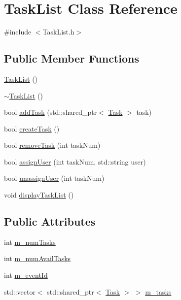 \hypertarget{class_task_list}{}\section{Task\+List Class Reference}
\label{class_task_list}


{\ttfamily \#include $<$Task\+List.\+h$>$}

\subsection*{Public Member Functions}
\begin{DoxyCompactItemize}
\item 
\mbox{\hyperlink{class_task_list_aa98ab27bfb922941bfa9d08704f41a3d}{Task\+List}} ()
\item 
\mbox{\hyperlink{class_task_list_a62532b7a52881d389f94ea891e38eeb8}{$\sim$\+Task\+List}} ()
\item 
bool \mbox{\hyperlink{class_task_list_a1f1547ccbb7037a1b00505284241d6f6}{add\+Task}} (std\+::shared\+\_\+ptr$<$ \mbox{\hyperlink{class_task}{Task}} $>$ task)
\item 
bool \mbox{\hyperlink{class_task_list_a74c877894c2f92c796100b1e975858ad}{create\+Task}} ()
\item 
bool \mbox{\hyperlink{class_task_list_a9d698ff0a0059aac3c77522029662239}{remove\+Task}} (int task\+Num)
\item 
bool \mbox{\hyperlink{class_task_list_ad4cfe5e33b887bf958f5623eca545ddd}{assign\+User}} (int task\+Num, std\+::string user)
\item 
bool \mbox{\hyperlink{class_task_list_aa67dfe4d6cdc1701c995e44bb0e59d56}{unassign\+User}} (int task\+Num)
\item 
void \mbox{\hyperlink{class_task_list_a234f082b802694c2e097bc42f74141df}{display\+Task\+List}} ()
\end{DoxyCompactItemize}
\subsection*{Public Attributes}
\begin{DoxyCompactItemize}
\item 
int \mbox{\hyperlink{class_task_list_a7ba2af1e1826f33d27e1969b77cb1727}{m\+\_\+num\+Tasks}}
\item 
int \mbox{\hyperlink{class_task_list_af43192a1b398aa2752fcd158976e5f57}{m\+\_\+num\+Avail\+Tasks}}
\item 
int \mbox{\hyperlink{class_task_list_ad347c2028b83cce0c14266a35d483bda}{m\+\_\+event\+Id}}
\item 
std\+::vector$<$ std\+::shared\+\_\+ptr$<$ \mbox{\hyperlink{class_task}{Task}} $>$ $>$ \mbox{\hyperlink{class_task_list_a192cb3c6f59d6c4b428a6d909ce2035d}{m\+\_\+tasks}}
\end{DoxyCompactItemize}
